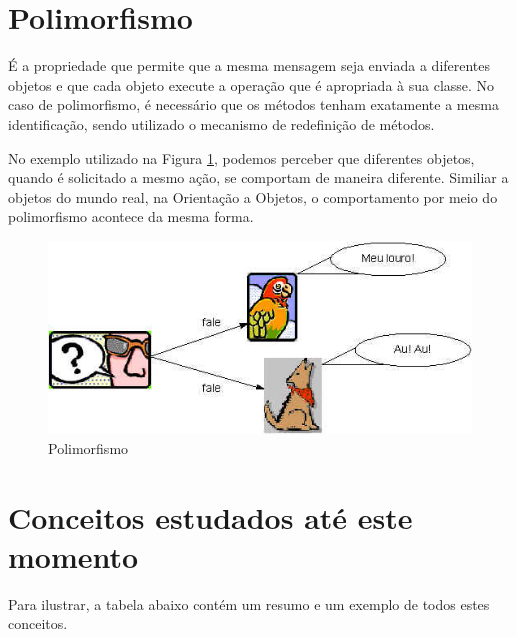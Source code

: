 \section{Polimorfismo}

É a propriedade que permite que a mesma mensagem seja enviada a diferentes objetos e que cada objeto execute a operação que é apropriada à sua classe. No caso de polimorfismo, é necessário que os métodos tenham exatamente a mesma identificação, sendo utilizado o mecanismo de redefinição de métodos.

No exemplo utilizado na Figura \ref{fig:polimorfismo}, podemos perceber que diferentes objetos, quando é solicitado a mesmo ação, se comportam de maneira diferente. Similiar a objetos do mundo real, na Orientação a Objetos, o comportamento por meio do polimorfismo acontece da mesma forma. 

\begin{figure}[H]
  \centering
  \includegraphics[scale=0.2]{imagens/polianimais.jpg}
  \caption{Polimorfismo}
  \label{fig:polimorfismo}
\end{figure}

\section{Conceitos estudados até este momento}

Para ilustrar, a tabela abaixo contém um resumo e um exemplo de todos estes conceitos.

